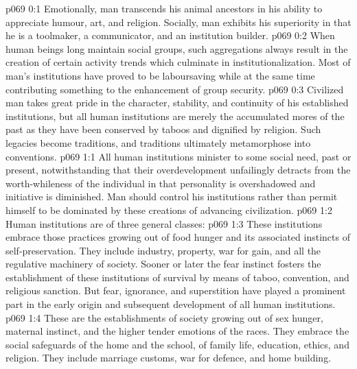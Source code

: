 \author{Melchizedek}
\vs p069 0:1 Emotionally, man transcends his animal ancestors in his ability to appreciate humour, art, and religion. Socially, man exhibits his superiority in that he is a toolmaker, a communicator, and an institution builder.
\vs p069 0:2 When human beings long maintain social groups, such aggregations always result in the creation of certain activity trends which culminate in institutionalization. Most of man’s institutions have proved to be laboursaving while at the same time contributing something to the enhancement of group security.
\vs p069 0:3 Civilized man takes great pride in the character, stability, and continuity of his established institutions, but all human institutions are merely the accumulated mores of the past as they have been conserved by taboos and dignified by religion. Such legacies become traditions, and traditions ultimately metamorphose into conventions.
\vs p069 1:1 All human institutions minister to some social need, past or present, notwithstanding that their overdevelopment unfailingly detracts from the worth\hyp{}whileness of the individual in that personality is overshadowed and initiative is diminished. Man should control his institutions rather than permit himself to be dominated by these creations of advancing civilization.
\vs p069 1:2 \pc Human institutions are of three general classes:
\vs p069 1:3 \bibnobreakspace {} These institutions embrace those practices growing out of food hunger and its associated instincts of self\hyp{}preservation. They include industry, property, war for gain, and all the regulative machinery of society. Sooner or later the fear instinct fosters the establishment of these institutions of survival by means of taboo, convention, and religious sanction. But fear, ignorance, and superstition have played a prominent part in the early origin and subsequent development of all human institutions.
\vs p069 1:4 \bibnobreakspace {} These are the establishments of society growing out of sex hunger, maternal instinct, and the higher tender emotions of the races. They embrace the social safeguards of the home and the school, of family life, education, ethics, and religion. They include marriage customs, war for defence, and home building.
